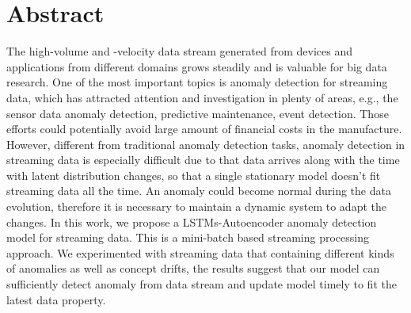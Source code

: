 \chapter*{Abstract}
\label{chap:abstract}
The high-volume and -velocity data stream generated from devices and applications from different domains grows steadily and is valuable for big data research. One of the most important topics is anomaly detection for streaming data, which has attracted attention and investigation in plenty of areas, e.g., the sensor data anomaly detection, predictive maintenance, event detection. Those efforts could potentially avoid large amount of financial costs in the manufacture. However, different from traditional anomaly detection tasks, anomaly detection in streaming data is especially difficult due to that data arrives along with the time with latent distribution changes, so that a single stationary model doesn’t fit streaming data all the time. An anomaly could become normal during the data evolution, therefore it is necessary to maintain a dynamic system to adapt the changes. In this work, we propose a LSTMs-Autoencoder anomaly detection model for streaming data. This is a mini-batch based streaming processing approach. We experimented with streaming data that containing different kinds of anomalies as well as concept drifts, the results suggest that our model can sufficiently detect anomaly from data stream and update model timely to fit the latest data property.
